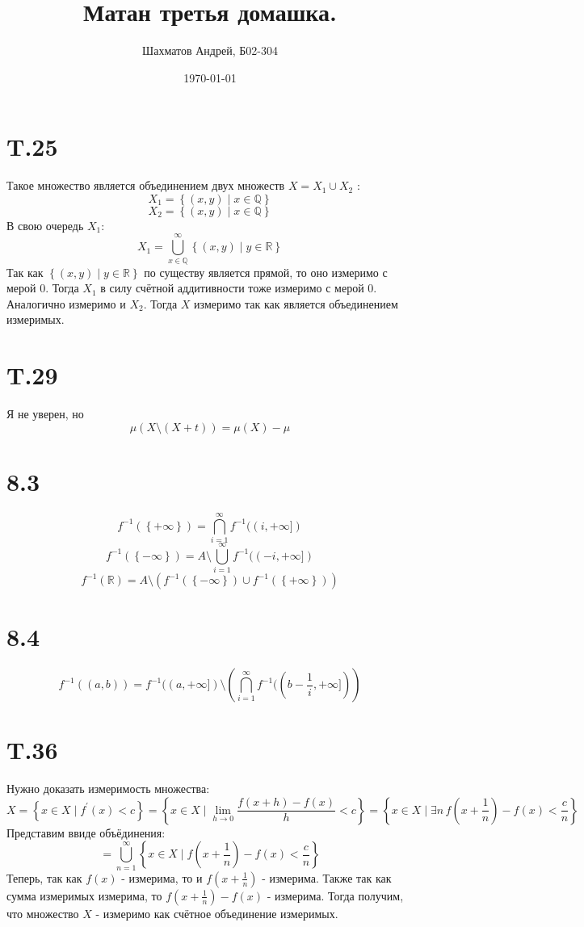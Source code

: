 \documentclass[12pt]{article}
\title{Матан третья домашка.}
\author{Шахматов Андрей, Б02-304}
\date{\today}
\begin{document}
\maketitle
\tableofcontents

\section{T.25}
Такое множество является объединением двух множеств $X = X_1 \cup X_2$ : 
\[
    X_1 = \left\{ (x, y) \mid x \in \mathbb{Q} \right\} 
\]
\[
    X_2 = \left\{ (x, y) \mid x \in \mathbb{Q} \right\}
\]
В свою очередь $X_1$:
\[
    X_1 = \bigcup_{x \in \mathbb{Q}}^{\infty} \left\{ (x, y) \mid y \in \mathbb{R} \right\}   
\]  
Так как $\left\{ (x, y) \mid y \in \mathbb{R} \right\}$ по существу является прямой, то оно измеримо 
с мерой $0$. Тогда $X_1$ в силу счётной аддитивности тоже измеримо с мерой $0$. Аналогично измеримо 
и $X_2$. Тогда $X$ измеримо так как является объединением измеримых.   
\section{T.29}
Я не уверен, но
\[
    \mu(X \setminus (X + t)) = \mu(X) - \mu 
\]

\section{8.3}
\[
    f^{-1}(\left\{ +\infty \right\} ) = \bigcap_{i=1}^{\infty} f^{-1}((i, +\infty] ) 
\] 
\[
    f^{-1}(\left\{ -\infty \right\} ) = A \setminus \bigcup_{i=1}^{\infty} f^{-1}((-i, +\infty ] ) 
\] 
\[
    f^{-1}(\mathbb{R}) = A \setminus \left( f^{-1}(\left\{ -\infty \right\} ) \cup f^{-1}(\left\{ +\infty \right\} ) \right) 
\]
\section{8.4}
\[
    f^{-1}((a, b)) = f^{-1}((a, +\infty]) \setminus \left( \bigcap_{i=1}^{\infty} f^{-1}((b - \frac{1}{i}, +\infty])  \right)   
\]
\section{T.36}
Нужно доказать измеримость множества: 
\[
    X = \left\{ x \in X \mid f^{\prime}(x) < c \right\} = 
    \left\{ x \in X \mid \lim_{h \to 0} \frac{f(x + h) - f(x)}{h} < c\right\} = 
    \left\{ x \in  X \mid \exists n \, f \left( x + \frac{1}{n} \right)   - f(x) < \frac{c}{n} \right\}
\]
Представим ввиде объёдинения: 
\[
    = \bigcup_{n=1}^{\infty} \left\{ x \in X \mid f \left( x + \frac{1}{n} \right)  - f(x) < \frac{c}{n} \right\}  
\]
Теперь, так как $f(x)$ - измерима, то и $f(x + \frac{1}{n})$ - измерима. Также 
так как сумма измеримых измерима, то $f(x + \frac{1}{n}) - f(x)$ - измерима. Тогда получим, что 
множество $X$ - измеримо как счётное объединение измеримых.    
\end{document}

